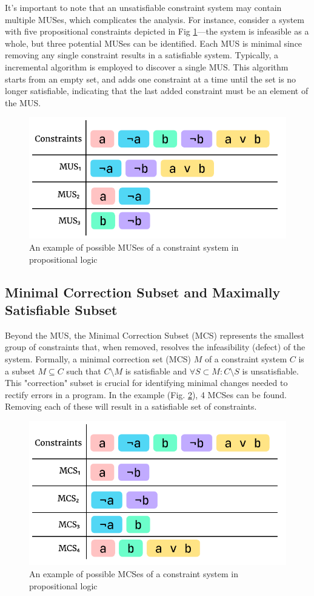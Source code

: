 It's important to note that an unsatisfiable constraint system may contain multiple MUSes, which complicates the analysis. For instance, consider a system with five propositional constraints depicted in Fig \ref{fig:mus-example}—the system is infeasible as a whole, but three potential MUSes can be identified. Each MUS is minimal since removing any single constraint results in a satisfiable system. Typically, a incremental algorithm is employed to discover a single MUS. This algorithm starts from an empty set, and adds one constraint at a time until the set is no longer satisfiable, indicating that the last added constraint must be an element of the MUS. 

\begin{figure}[hbt]
  \includegraphics[width=0.8\linewidth]{MUS}
  \caption{
    \label{fig:mus-example}
      An example of possible MUSes of a constraint system in propositional logic}
\end{figure}

\subsection{Minimal Correction Subset and Maximally Satisfiable Subset}

Beyond the MUS, the Minimal Correction Subset (MCS) represents the smallest group of constraints that, when removed, resolves the infeasibility (defect) of the system. Formally, a minimal correction set (MCS) $M$ of a constraint system $C$ is a subset $M \subseteq C$ such that $C \setminus M$ is satisfiable and $\forall{S} \subset M : C \setminus S$ is unsatisfiable. This "correction" subset is crucial for identifying minimal changes needed to rectify errors in a program. In the example (Fig. \ref{fig:mcs-example}), 4 MCSes can be found. Removing each of these will result in a satisfiable set of constraints. 


\begin{figure}[hbt]
  \includegraphics[width=0.8\linewidth]{MCS}
  \caption{
    \label{fig:mcs-example}
      An example of possible MCSes of a constraint system in propositional logic}
\end{figure}

